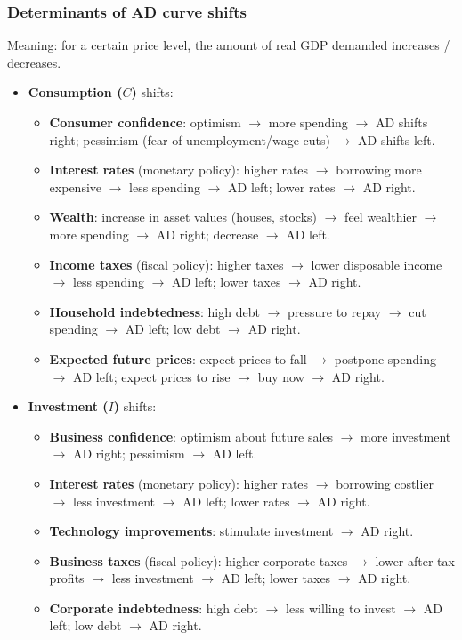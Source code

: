 \documentclass[a4paper,12pt]{article}
\begin{document}
\subsubsection*{Determinants of AD curve shifts}
Meaning: for a certain price level, the amount of real GDP demanded increases / decreases.
\begin{itemize}
  \item \textbf{Consumption ($C$)} shifts:
  \begin{itemize}
    \item \textbf{Consumer confidence}: optimism $\to$ more spending $\to$ AD shifts right; pessimism (fear of unemployment/wage cuts) $\to$ AD shifts left.
    \item \textbf{Interest rates} (monetary policy): higher rates $\to$ borrowing more expensive $\to$ less spending $\to$ AD left; lower rates $\to$ AD right.
    \item \textbf{Wealth}: increase in asset values (houses, stocks) $\to$ feel wealthier $\to$ more spending $\to$ AD right; decrease $\to$ AD left.
    \item \textbf{Income taxes} (fiscal policy): higher taxes $\to$ lower disposable income $\to$ less spending $\to$ AD left; lower taxes $\to$ AD right.
    \item \textbf{Household indebtedness}: high debt $\to$ pressure to repay $\to$ cut spending $\to$ AD left; low debt $\to$ AD right.
    \item \textbf{Expected future prices}: expect prices to fall $\to$ postpone spending $\to$ AD left; expect prices to rise $\to$ buy now $\to$ AD right.
  \end{itemize}
  \item \textbf{Investment ($I$)} shifts:
  \begin{itemize}
    \item \textbf{Business confidence}: optimism about future sales $\to$ more investment $\to$ AD right; pessimism $\to$ AD left.
    \item \textbf{Interest rates} (monetary policy): higher rates $\to$ borrowing costlier $\to$ less investment $\to$ AD left; lower rates $\to$ AD right.
    \item \textbf{Technology improvements}: stimulate investment $\to$ AD right.
    \item \textbf{Business taxes} (fiscal policy): higher corporate taxes $\to$ lower after-tax profits $\to$ less investment $\to$ AD left; lower taxes $\to$ AD right.
    \item \textbf{Corporate indebtedness}: high debt $\to$ less willing to invest $\to$ AD left; low debt $\to$ AD right.

\end{itemize}
\end{itemize}
\end{document}
